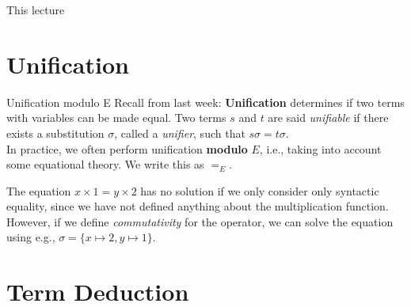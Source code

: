 \documentclass[11pt,aspectratio=169]{beamer}
\begin{document}
\begin{frame}[fragile]{This lecture}
    \tableofcontents
\end{frame}


\section{Unification}


\begin{frame}[fragile]{Unification modulo E}
    Recall from last week: \textbf{Unification} determines if two terms with 
    variables can be made equal. Two terms $s$ and $t$ are said \textit
    {unifiable} if there exists a substitution $\sigma$, called a \textit
    {unifier}, such that $s\sigma = t\sigma$.\\[.3cm]

    In practice, we often perform unification \textbf{modulo} $E$, i.e., taking 
    into account some equational theory. We write this as $=_E$.

    \begin{tcolorbox}[title=Example]
        The equation $x \times 1 = y \times 2$ has no solution if we only 
        consider only syntactic equality, since we have not defined anything 
        about the multiplication function. However, if we define
        \textit{commutativity} for the operator, we can solve the equation 
        using e.g., $\sigma = \{x \mapsto 2, y \mapsto 1\}$.
    \end{tcolorbox}
\end{frame}


\section{Term Deduction}

\end{document}

